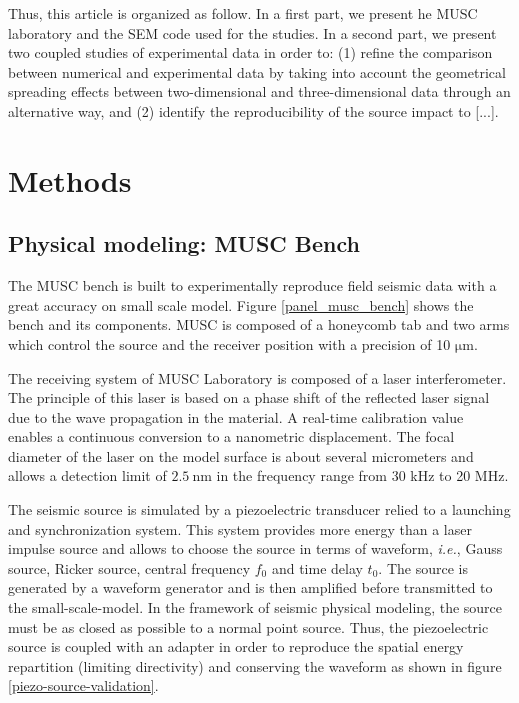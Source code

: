 \documentclass[manuscript,revised]{geophysics}
\newcommand{\twod}{two-dimensional }
\newcommand{\thrd}{three-dimensional }
\begin{document}

\noindent Thus, this article is organized as follow. In a first part, we present he MUSC laboratory and the SEM code used for the studies. In a second part, we present two coupled studies of experimental data in order to: (1) refine the comparison between numerical and experimental data by taking into account the geometrical spreading effects between \twod and \thrd data through an alternative way, and (2) identify the reproducibility of the source impact to [...].


\section{Methods}

\subsection{Physical modeling: MUSC Bench}

\noindent The MUSC bench \citep{Bretaudeau_SSA_2008b,Bretaudeau_SSM_2011,Bretaudeau_FWI_2013} is built to experimentally reproduce field seismic data with a great accuracy on small scale model. Figure \ref{panel_musc_bench} shows the bench and its components. MUSC is composed of a honeycomb tab and two arms which control the source and the receiver position with a precision of 10 $\mathrm{\mu m}$.

\noindent The receiving system of MUSC Laboratory is composed of a laser interferometer. The principle of this laser is based on a phase shift of the reflected laser signal due to the wave propagation in the material. A real-time calibration value enables a continuous conversion to a nanometric displacement. The focal diameter of the laser on the model surface is about several micrometers and allows a detection limit of $\mathrm{2.5\ nm}$ in the frequency range from 30 kHz to 20 MHz.

\noindent The seismic source is simulated by a piezoelectric transducer relied to a launching and synchronization system. This system provides more energy than a laser impulse source \citep{Bretaudeau_PHD_2010,Bretaudeau_SSM_2011} and allows to choose the source in terms of waveform, \textit{i.e.}, Gauss source, Ricker source, central frequency $f_{0}$ and time delay $t_{0}$. The source is generated by a waveform generator and is then amplified before transmitted to the small-scale-model. In the framework of seismic physical modeling, the source must be as closed as possible to a normal point source. Thus, the piezoelectric source is coupled with an adapter in order to reproduce the spatial energy repartition (limiting directivity) and conserving the waveform as shown in figure \ref{piezo-source-validation}.
\end{document}

